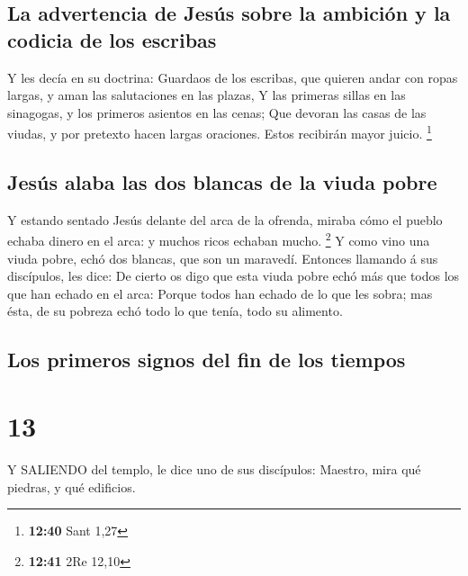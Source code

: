 \hypertarget{la-advertencia-de-jesuxfas-sobre-la-ambiciuxf3n-y-la-codicia-de-los-escribas}{%
\subsection{La advertencia de Jesús sobre la ambición y la codicia de
los
escribas}\label{la-advertencia-de-jesuxfas-sobre-la-ambiciuxf3n-y-la-codicia-de-los-escribas}}

 Y les decía en su doctrina: Guardaos de los escribas, que
quieren andar con ropas largas, y aman las salutaciones en las plazas,
 Y las primeras sillas en las sinagogas, y los primeros
asientos en las cenas;  Que devoran las casas de las
viudas, y por pretexto hacen largas oraciones. Estos recibirán mayor
juicio. \footnote{\textbf{12:40} Sant 1,27}

\hypertarget{jesuxfas-alaba-las-dos-blancas-de-la-viuda-pobre}{%
\subsection{Jesús alaba las dos blancas de la viuda
pobre}\label{jesuxfas-alaba-las-dos-blancas-de-la-viuda-pobre}}

 Y estando sentado Jesús delante del arca de la ofrenda,
miraba cómo el pueblo echaba dinero en el arca: y muchos ricos echaban
mucho. \footnote{\textbf{12:41} 2Re 12,10}  Y como vino una
viuda pobre, echó dos blancas, que son un maravedí. 
Entonces llamando á sus discípulos, les dice: De cierto os digo que esta
viuda pobre echó más que todos los que han echado en el arca:
 Porque todos han echado de lo que les sobra; mas ésta, de
su pobreza echó todo lo que tenía, todo su alimento.

\hypertarget{los-primeros-signos-del-fin-de-los-tiempos}{%
\subsection{Los primeros signos del fin de los
tiempos}\label{los-primeros-signos-del-fin-de-los-tiempos}}

\hypertarget{section-12}{%
\section{13}\label{section-12}}

 Y SALIENDO del templo, le dice uno de sus discípulos:
Maestro, mira qué piedras, y qué edificios.

